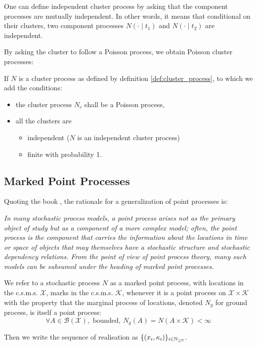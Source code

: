 \begin{remarque}
One can define independent cluster process by asking that the component processes are mutually independent. In other words, it means that conditional on their clusters, two component processes $N(\cdot \mid t_1)$ and $N(\cdot \mid t_2)$ are independent.
\end{remarque}


By asking the cluster to follow a Poisson process, we obtain Poisson cluster processes:

\begin{definition}
\label{def:poisson_cluster}
If $N$ is a cluster process as defined by definition \ref{def:cluster_process}, to which we add the conditions:

\begin{itemize}
\setlength{\itemindent}{2.5 cm}
\item the cluster process $N_c$ shall be a Poisson process,
\item all the clusters are 
\begin{itemize}
\setlength{\itemindent}{3 cm}
\item independent ($N$ is an independent cluster process)
\item finite with probability 1.
\end{itemize}
\end{itemize}

\end{definition}




\newpage
\subsection{Marked Point Processes}
Quoting the book \cite{daley}, the rationale for a generalization of point processes is:

\textit{In many stochastic process models, a point process arises not as the primary object of study but as a component of a more complex model; often, the point process is the component that carries the information about the locations in time or space of objects that may themselves have a stochastic structure and stochastic dependency relations. From the point of view of point process theory, many such models can be subsumed under the heading of marked point processes.}

\begin{definition}
We refer to a stochastic process $N$ as a marked point process, with locations in the c.s.m.s. $\mathcal X$, marks in the c.s.m.s. $\mathcal K$, whenever it is a point process on $\mathcal X \times \mathcal K$ with the property that the marginal process of locations, denoted $N_g$ for ground process, is itself a point process:
\begin{equation} 
\forall A \in \mathcal B ( \mathcal X ), \text{ bounded}, \ N_g ( A ) = N( A \times \mathcal K ) < \infty
\end{equation}

Then we write the sequence of realisation as $ \{  (x_i,\kappa_i)  \}_{ i \in \mathbb{N}_{\geq 0}} $.
\end{definition}


